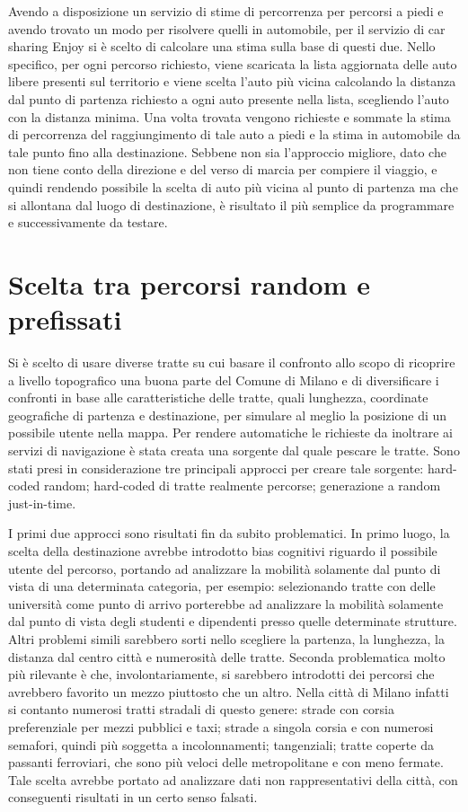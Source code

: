 Avendo a disposizione un servizio di stime di percorrenza per percorsi a piedi e avendo trovato un modo per risolvere quelli in automobile, per il servizio di car sharing Enjoy si è scelto di calcolare una stima sulla base di questi due. Nello specifico, per ogni percorso richiesto, viene scaricata la lista aggiornata delle auto libere presenti sul territorio e viene scelta l'auto più vicina calcolando la distanza dal punto di partenza richiesto a ogni auto presente nella lista, scegliendo l'auto con la distanza minima. Una volta trovata vengono richieste e sommate la stima di percorrenza del raggiungimento di tale auto a piedi e la stima in automobile da tale punto fino alla destinazione. Sebbene non sia l'approccio migliore, dato che non tiene conto della direzione e del verso di marcia per compiere il viaggio, e quindi rendendo possibile la scelta di auto più vicina al punto di partenza ma che si allontana dal luogo di destinazione, è risultato il più semplice da programmare e successivamente da testare.

\section{Scelta tra percorsi random e prefissati}

Si è scelto di usare diverse tratte su cui basare il confronto allo scopo di ricoprire a livello topografico una buona parte del Comune di Milano e di diversificare i confronti in base alle caratteristiche delle tratte, quali lunghezza, coordinate geografiche di partenza e destinazione, per simulare al meglio la posizione di un possibile utente nella mappa. Per rendere automatiche le richieste da inoltrare ai servizi di navigazione è stata creata una sorgente dal quale pescare le tratte. Sono stati presi in considerazione tre principali approcci per creare tale sorgente: hard-coded random; hard-coded di tratte realmente percorse; generazione a random just-in-time.

I primi due approcci sono risultati fin da subito problematici. In primo luogo, la scelta della destinazione avrebbe introdotto bias cognitivi riguardo il possibile utente del percorso, portando ad analizzare la mobilità solamente dal punto di vista di una determinata categoria, per esempio: selezionando tratte con delle università come punto di arrivo porterebbe ad analizzare la mobilità solamente dal punto di vista degli studenti e dipendenti presso quelle determinate strutture. Altri problemi simili sarebbero sorti nello scegliere la partenza, la lunghezza, la distanza dal centro città e numerosità delle tratte. Seconda problematica molto più rilevante è che, involontariamente, si sarebbero introdotti dei percorsi che avrebbero favorito un mezzo piuttosto che un altro. Nella città di Milano infatti si contanto numerosi tratti stradali di questo genere: strade con corsia preferenziale per mezzi pubblici e taxi; strade a singola corsia e con numerosi semafori, quindi più soggetta a incolonnamenti; tangenziali; tratte coperte da passanti ferroviari, che sono più veloci delle metropolitane e con meno fermate. Tale scelta avrebbe portato ad analizzare dati non rappresentativi della città, con conseguenti risultati in un certo senso falsati.

